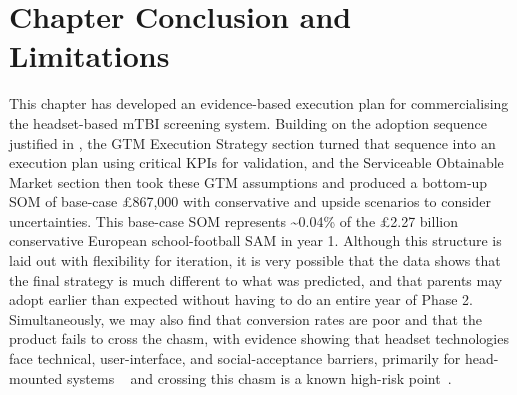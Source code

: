 \section{Chapter Conclusion and Limitations}
This chapter has developed an evidence-based execution plan for commercialising the headset-based mTBI screening system. Building on the adoption sequence justified in , the GTM Execution Strategy section turned that sequence into an execution plan using critical KPIs for validation, and the Serviceable Obtainable Market section then took these GTM assumptions and produced a bottom-up SOM of base-case \pounds{}867,000 with conservative and upside scenarios to consider uncertainties. This base-case SOM represents \textasciitilde{}0.04\% of the \pounds{}2.27 billion conservative European school-football SAM in year 1.
Although this structure is laid out with flexibility for iteration, it is very possible that the data shows that the final strategy is much different to what was predicted, and that parents may adopt earlier than expected without having to do an entire year of Phase 2. Simultaneously, we may also find that conversion rates are poor and that the product fails to cross the chasm, with evidence showing that headset technologies face technical, user-interface, and social-acceptance barriers, primarily for head-mounted systems ~\cite{billinghurst2015ar} and crossing this chasm is a known high-risk point~\cite{moore1991chasm}.
